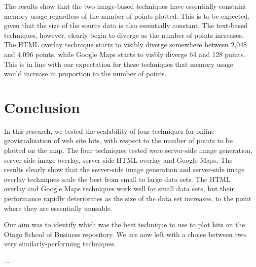 \documentclass[acmtocl,acmnow]{acmtrans2m}
\begin{document}
The results show that the two image-based techniques have essentially
constaint memory usage regardless of the number of points plotted. This
is to be expected, given that the size of the source data is also
essentially constant. The text-based techniques, however, clearly begin
to diverge as the number of points increases. The HTML overlay technique
starts to visibly diverge somewhere between 2,048 and 4,096 points,
while Google Maps starts to visbly diverge 64 and 128 points. This is in
line with our expectation for these techniques that memory usage would
increase in proportion to the number of points.


\section{Conclusion}

In this research, we tested the scalability of four techniques for
online geovisualization of web site hits, with respect to the number of
points to be plotted on the map. The four techniques tested were
server-side image generation, server-side image overlay, server-side
HTML overlay and Google Maps. The results clearly show that the
server-side image generation and server-side image overlay techniques
scale the best from small to large data sets. The HTML overlay and
Google Maps techniques work well for small data sets, but their
performance rapidly deteriorates as the size of the data set increases,
to the point where they are essentially unusable.

Our aim was to identify which was the best technique to use to plot hits
on the Otago School of Business repository. We are now left with a choice
between two very similarly-performing techniques.







\begin{received}
...
\end{received}
\end{document}
